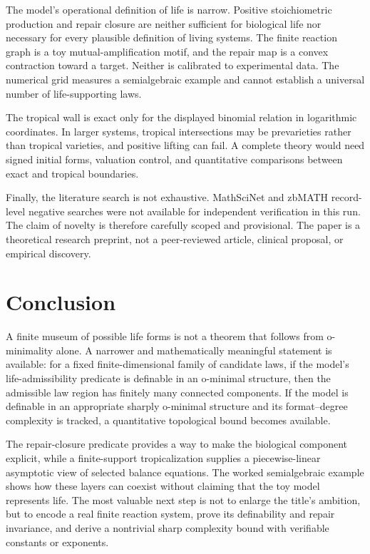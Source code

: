 \documentclass[11pt,a4paper]{article}
\theoremstyle{definition}
\theoremstyle{remark}
\begin{document}
The model's operational definition of life is narrow. Positive stoichiometric production and repair closure are neither sufficient for biological life nor necessary for every plausible definition of living systems. The finite reaction graph is a toy mutual-amplification motif, and the repair map is a convex contraction toward a target. Neither is calibrated to experimental data. The numerical grid measures a semialgebraic example and cannot establish a universal number of life-supporting laws.

The tropical wall is exact only for the displayed binomial relation in logarithmic coordinates. In larger systems, tropical intersections may be prevarieties rather than tropical varieties, and positive lifting can fail. A complete theory would need signed initial forms, valuation control, and quantitative comparisons between exact and tropical boundaries.

Finally, the literature search is not exhaustive. MathSciNet and zbMATH record-level negative searches were not available for independent verification in this run. The claim of novelty is therefore carefully scoped and provisional. The paper is a theoretical research preprint, not a peer-reviewed article, clinical proposal, or empirical discovery.


\section{Conclusion}
A finite museum of possible life forms is not a theorem that follows from o-minimality alone. A narrower and mathematically meaningful statement is available: for a fixed finite-dimensional family of candidate laws, if the model's life-admissibility predicate is definable in an o-minimal structure, then the admissible law region has finitely many connected components. If the model is definable in an appropriate sharply o-minimal structure and its format--degree complexity is tracked, a quantitative topological bound becomes available.

The repair-closure predicate provides a way to make the biological component explicit, while a finite-support tropicalization supplies a piecewise-linear asymptotic view of selected balance equations. The worked semialgebraic example shows how these layers can coexist without claiming that the toy model represents life. The most valuable next step is not to enlarge the title's ambition, but to encode a real finite reaction system, prove its definability and repair invariance, and derive a nontrivial sharp complexity bound with verifiable constants or exponents.
\end{document}
